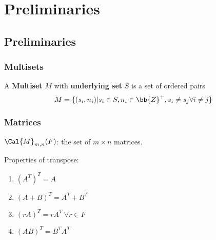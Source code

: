 \documentclass[../main.tex]{subfiles}
\begin{document}
\chapter{Preliminaries}

\section{Preliminaries}

\subsection*{Multisets}

A \textbf{Multiset} $M$ with \textbf{underlying set} $S$ is a set of ordered pairs 
\begin{equation*}
    M = \{(s_i, n_i) | s_i \in S, n_i \in \bb{Z}^+, s_i \neq s_j \forall i \neq j\}
\end{equation*}

\subsection*{Matrices}

$\Cal{M}_{m,n}(F)$: the set of $m \times n$ matrices.

Properties of transpose:
\begin{enumerate}[label = \arabic*.]
    \item ${(A^T)}^T = A$ 
    \item ${(A+B)}^T = A^T + B^T$
    \item ${(rA)}^T = rA^T~\forall r \in F$
    \item ${(AB)}^T = B^T A^T$
\end{enumerate}
\end{document}
